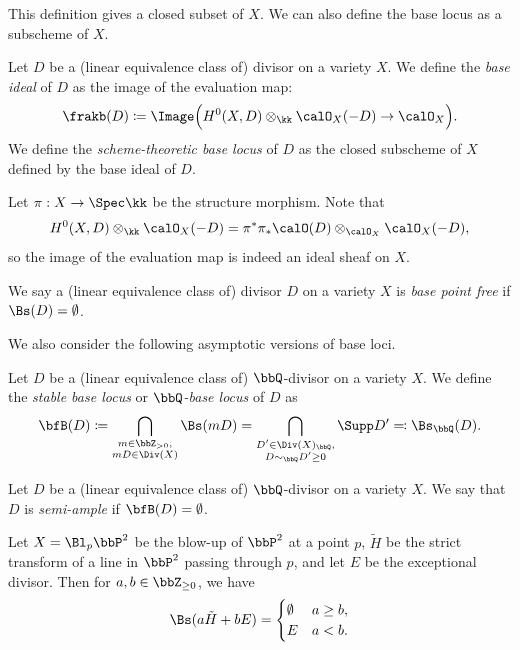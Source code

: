   This definition gives a closed subset of $X$.
  We can also define the base locus as a subscheme of $X$.


  \begin{definition}
    Let $D$ be a (linear equivalence class of) divisor on a variety $X$.
    We define the \emph{base ideal} of $D$ as the image of the evaluation map:
    \[ \frakb(D) \coloneqq \Image\Bigl( H^0(X, D) \otimes_\kk \calO_X(-D) \to \calO_X \Bigr). \]
    We define the \emph{scheme-theoretic base locus} of $D$ as the closed subscheme of $X$ defined by the base ideal of $D$.
  \end{definition}

  Let $\pi: X \to \Spec \kk$ be the structure morphism.
  Note that 
  \[ H^0(X, D) \otimes_\kk \calO_X(-D) = \pi^*\pi_*\calO(D) \otimes_{\calO_X} \calO_X(-D), \]
  so the image of the evaluation map is indeed an ideal sheaf on $X$.

  \begin{definition}
    We say a (linear equivalence class of) divisor $D$ on a variety $X$ is \emph{base point free} if $\Bs(D) = \emptyset$.
  \end{definition}

  We also consider the following asymptotic versions of base loci.
  \begin{definition}
    Let $D$ be a (linear equivalence class of) $\bbQ$-divisor on a variety $X$.
    We define the \emph{stable base locus} or \emph{$\bbQ$-base locus} of $D$ as
    \[ \bfB(D) \coloneqq \bigcap_{\substack{m \in \bbZ_{>0},\\ mD \in \Div(X)}} \Bs(mD) = \bigcap_{\substack{D' \in \Div(X)_\bbQ, \\ D \sim_\bbQ D'\geq 0}} \Supp D' \eqqcolon \Bs_\bbQ(D). \]
  \end{definition}

  \begin{definition}
    Let $D$ be a (linear equivalence class of) $\bbQ$-divisor on a variety $X$.
    We say that $D$ is \emph{semi-ample} if $\bfB(D) = \emptyset$.
  \end{definition}

  
  \begin{example}
    Let $X = \Bl_p \bbP^2$ be the blow-up of $\bbP^2$ at a point $p$, $\tilde{H}$ be the strict transform of a line in $\bbP^2$ passing through $p$, and let $E$ be the exceptional divisor.
    Then for $a,b \in \bbZ_{\geq 0}$, we have
    \[ \Bs(a\tilde{H} + bE) = \begin{cases}
      \emptyset & a \geq b, \\
      E & a < b.
    \end{cases} \]
  \end{example}

